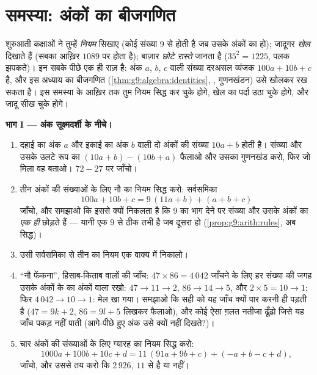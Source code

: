 \section{समस्या: अंकों का बीजगणित}

\begin{problem}
\label{pb:g9:algebra:1}
शुरुआती कक्षाओं ने तुम्हें \emph{नियम} सिखाए (कोई संख्या $9$ से
 होती है जब उसके अंकों का   हो); जादूगर
\emph{खेल} दिखाते हैं (सबका आख़िर $1089$ पर होता है); बाज़ार
\emph{छोटे रास्ते} जानता है ($35^2 = 1225$, पलक झपकते)। इन सबके पीछे
एक ही राज़ है: अंक $a$, $b$, $c$ वाली संख्या दरअसल व्यंजक
$100a + 10b + c$ है, और इस अध्याय का बीजगणित
(\cref{thm:g9:algebra:identities}, , गुणनखंडन) उसे खोलकर रख
सकता है। इस समस्या के आख़िर तक तुम नियम सिद्ध कर चुके होगे, खेल का
पर्दा उठा चुके होगे, और जादू सीख चुके होगे।

\medskip
\noindent\textbf{भाग I --- अंक सूक्ष्मदर्शी के नीचे।}
\begin{enumerate}
  \item दहाई का अंक $a$ और इकाई का अंक $b$ वाली दो अंकों की संख्या
        $10a + b$ होती है। संख्या और उसके उलटे रूप का 
        $(10a + b) - (10b + a)$ फैलाओ और उसका गुणनखंड करो, फिर जो
        मिला वह बताओ। $72 - 27$ पर जाँचो।
  \item तीन अंकों की संख्याओं के लिए नौ का नियम सिद्ध करो:
        सर्वसमिका
        \[
        100a + 10b + c = 9\,(11a + b) + (a + b + c)
        \]
        जाँचो, और समझाओ कि इससे क्यों निकलता है कि $9$ का भाग देने
        पर संख्या और उसके अंकों का  \emph{एक ही } छोड़ते
        हैं --- यानी एक $9$ से  ठीक तभी है जब दूसरा हो
        (\cref{prop:g9:arith:rules}, अब सिद्ध)।
  \item उसी सर्वसमिका से तीन का नियम एक वाक्य में निकालो।
  \item ``नौ फेंकना'', हिसाब-किताब वालों की जाँच: $47 \times 86 =
        4\,042$ जाँचने के लिए हर संख्या की जगह उसके अंकों के 
        का अंकों वाला  रखो: $47 \to 11 \to 2$,
        $86 \to 14 \to 5$, और $2 \times 5 = 10 \to 1$; फिर
        $4\,042 \to 10 \to 1$: मेल खा गया। समझाओ कि सही  को
        यह जाँच क्यों पार करनी ही पड़ती है ($47 = 9k + 2$,
        $86 = 9l + 5$ लिखकर फैलाओ), और कोई ऐसा ग़लत नतीजा ढूँढ़ो
        जिसे यह जाँच पकड़ नहीं पाती (आगे-पीछे हुए अंक उसे क्यों
        नहीं दिखते?)।
  \item चार अंकों की संख्याओं के लिए ग्यारह का नियम सिद्ध करो:
        \[
        1000a + 100b + 10c + d
        = 11\,(91a + 9b + c) + (- a + b - c + d),
        \]
        जाँचो, और उससे तय करो कि $2\,926$, $11$ से  है या
        नहीं।
\end{enumerate}


\end{problem}
